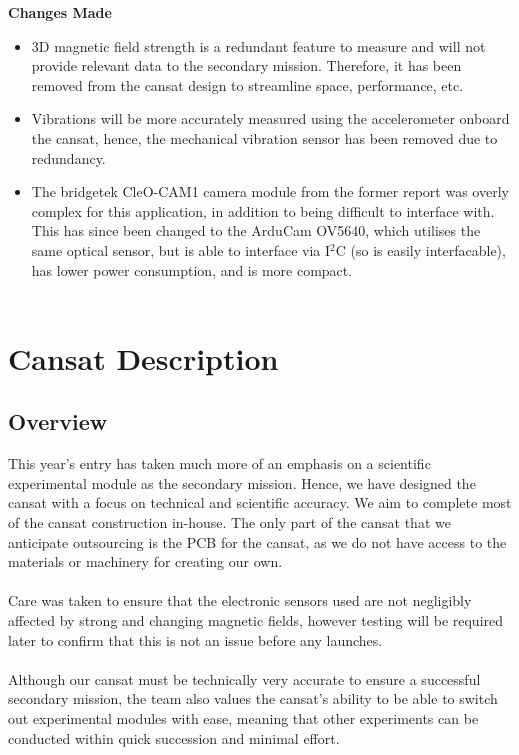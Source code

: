 \documentclass{report}
\begin{document}
		{\color{blue} \textbf{Changes Made}
		\begin{itemize}
			\item 3D magnetic field strength is a redundant feature to measure
			and will not provide relevant data to the secondary mission. Therefore,
			it has been removed from the cansat design to streamline space, 
			performance, etc.
			\item Vibrations will be more accurately measured using the 
			accelerometer onboard the cansat, hence, the mechanical vibration
			sensor has been removed due to redundancy.
			\item The bridgetek CleO-CAM1 camera module from the former 
			report was overly complex for this application, in addition to being
			difficult to interface with. This has since been changed to the ArduCam
			OV5640, which utilises the same optical sensor, but is able to interface
			via I$^2$C (so is easily interfacable), has lower power consumption, and
			is more compact.\\\\
		\end{itemize}
		}
		


\chapter{Cansat Description}
	\section{Overview}
		This year’s entry has taken much more of an emphasis on a scientific
		experimental module as the secondary mission. Hence, we have designed 
		the cansat with a focus on technical and scientific accuracy. We aim to
		complete most of the cansat construction in-house. The only part of the
		cansat that we anticipate outsourcing is the PCB for the cansat, as we do
		not have access to the materials or machinery for creating our own.
		\\\\
		Care was taken to ensure that the electronic sensors used are not 
		negligibly affected by strong and changing magnetic fields, however 
		testing will be required later to confirm that this is not an issue before 
		any launches.
		\\\\
		{\color{blue}Although our cansat must be technically very accurate to ensure
		a successful secondary mission, the team also values the cansat's ability
		to be able to switch out experimental modules with ease, meaning that
		other experiments can be conducted within quick succession and minimal
		effort.}
\end{document}
